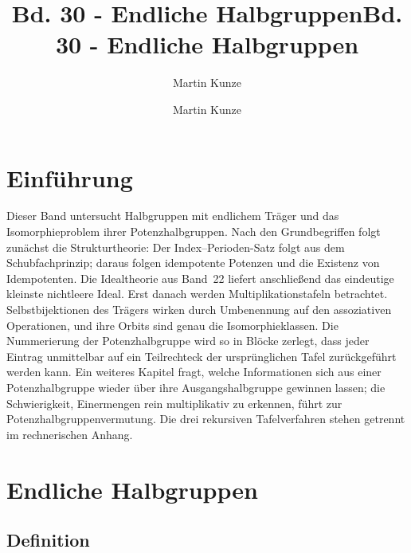 \documentclass[main.tex]{subfiles}
\title{Bd. 30 - Endliche Halbgruppen}
\author{Martin Kunze}
\date{}
\begin{document}
\title{Bd. 30 - Endliche Halbgruppen}
\author{Martin Kunze}
\date{}
\hypersetup{pageanchor=false}
\maketitle
\hypersetup{pageanchor=true}
\setcounter{tocdepth}{3}
\tableofcontents
\setcounter{file}{30}
\renewcommand{\FormulaBandID}{30}

\chapter{Einführung}

Dieser Band untersucht Halbgruppen mit endlichem Träger und das
Isomorphieproblem ihrer Potenzhalbgruppen.  Nach den Grundbegriffen folgt
zunächst die Strukturtheorie: Der Index--Perioden-Satz folgt aus dem
Schubfachprinzip; daraus folgen idempotente
Potenzen und die Existenz von Idempotenten.  Die Idealtheorie aus Band~22
liefert anschließend das eindeutige kleinste nichtleere Ideal.  Erst danach
werden Multiplikationstafeln betrachtet.  Selbstbijektionen des Trägers
wirken durch Umbenennung auf den assoziativen Operationen, und ihre Orbits
sind genau die Isomorphieklassen.  Die Nummerierung der Potenzhalbgruppe wird
so in Blöcke zerlegt, dass jeder Eintrag unmittelbar auf ein Teilrechteck
der ursprünglichen Tafel zurückgeführt werden kann.  Ein weiteres Kapitel
fragt, welche Informationen sich aus einer Potenzhalbgruppe wieder über
ihre Ausgangshalbgruppe gewinnen lassen; die Schwierigkeit, Einermengen rein
multiplikativ zu erkennen, führt zur Potenzhalbgruppenvermutung.  Die drei
rekursiven Tafelverfahren stehen getrennt im rechnerischen Anhang.

\chapter{Endliche Halbgruppen}

\section{Definition}

\end{document}
